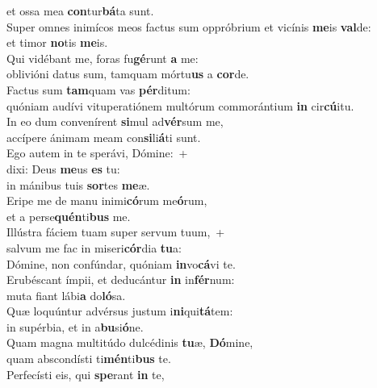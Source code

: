 \oddverse et ossa mea \textbf{con}tur\textbf{bá}ta sunt.\\
\evenverse Super omnes inimícos meos factus sum oppróbrium et vicínis \textbf{me}is \textbf{val}de:~\*\\
\evenverse et timor \textbf{no}tis \textbf{me}is.\\
\oddverse Qui vidébant me, foras fu\textbf{gé}runt \textbf{a} me:~\*\\
\oddverse oblivióni datus sum, tamquam mórtu\textbf{us} a \textbf{cor}de.\\
\evenverse Factus sum \textbf{tam}quam vas \textbf{pér}ditum:~\*\\
\evenverse quóniam audívi vituperatiónem multórum commorántium \textbf{in} cir\textbf{cú}itu.\\
\oddverse In eo dum convenírent \textbf{si}mul ad\textbf{vér}sum me,~\*\\
\oddverse accípere ánimam meam con\textbf{si}li\textbf{á}ti sunt.\\
\evenverse Ego autem in te sperávi, Dómine:~+\\
\evenverse  dixi: Deus \textbf{me}us \textbf{es} tu:~\*\\
\evenverse in mánibus tuis \textbf{sor}tes \textbf{me}æ.\\
\oddverse Eripe me de manu inimi\textbf{có}rum me\textbf{ó}rum,~\*\\
\oddverse et a perse\textbf{quén}ti\textbf{bus} me.\\
\evenverse Illústra fáciem tuam super servum tuum,~+\\
\evenverse  salvum me fac in miseri\textbf{cór}dia \textbf{tu}a:~\*\\
\evenverse Dómine, non confúndar, quóniam \textbf{in}vo\textbf{cá}vi te.\\
\oddverse Erubéscant ímpii, et deducántur \textbf{in} in\textbf{fér}num:~\*\\
\oddverse muta fiant lábi\textbf{a} do\textbf{ló}sa.\\
\evenverse Quæ loquúntur advérsus justum i\textbf{ni}qui\textbf{tá}tem:~\*\\
\evenverse in supérbia, et in a\textbf{bu}si\textbf{ó}ne.\\
\oddverse Quam magna multitúdo dulcédinis \textbf{tu}æ, \textbf{Dó}mine,~\*\\
\oddverse quam abscondísti ti\textbf{mén}ti\textbf{bus} te.\\
\evenverse Perfecísti eis, qui \textbf{spe}rant \textbf{in} te,~\*\\
